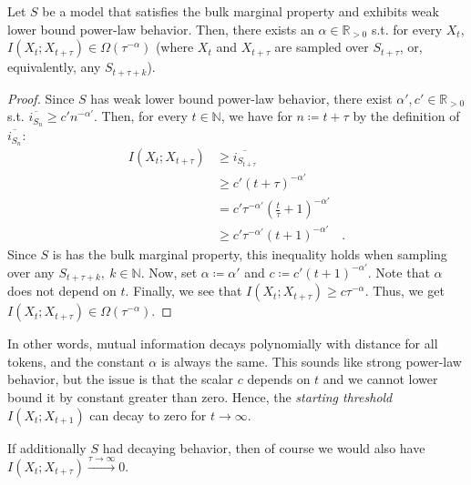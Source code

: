 \documentclass[../../main.tex]{subfiles}
\begin{document}
    \begin{theorem}
        \label{theorem:power_law_decay_in_well-behaved_models_with_weak_power-law_behavior}
        Let $S$ be a model that satisfies the bulk marginal property and exhibits weak lower bound power-law behavior. Then, there exists an $\alpha \in \mathbb{R}_{>0}$ s.t. for every $X_t$, $I(X_{t}; X_{t + \tau}) \in \Omega(\tau^{-\alpha})$ (where $X_t$ and $X_{t + \tau}$ are sampled over $S_{t + \tau}$, or, equivalently, any $S_{t + \tau + k}$).
    \end{theorem}
    \vspace{-2.5em}
    \begin{proof}
        Since $S$ has weak lower bound power-law behavior, there exist $\alpha', c' \in \mathbb{R}_{>0}$ s.t. $\overline{i_{S_n}} \geq c' n^{-\alpha'}$. Then, for every $t \in \mathbb{N}$, we have for $n \coloneqq t + \tau$ by the definition of $\overline{i_{S_n}}$:
        \begin{align*}
            I(X_{t}; X_{t + \tau}) &\geq \overline{i_{S_{t + \tau}}} \\
            &\geq c' (t + \tau)^{-\alpha'} \\
            &= c' \tau^{-\alpha'} (\frac{t}{\tau} + 1)^{-\alpha'} \\
            &\geq c' \tau^{-\alpha'} (t + 1)^{-\alpha'} \quad .
        \end{align*}
        Since $S$ is has the bulk marginal property, this inequality holds when sampling over any $S_{t + \tau + k}, \ k \in \mathbb{N}$. Now, set $\alpha \coloneqq \alpha'$ and $c \coloneqq c' (t + 1)^{-\alpha'}$. Note that $\alpha$ does not depend on $t$. Finally, we see that $I(X_{t}; X_{t + \tau}) \geq c \tau^{-\alpha}$. Thus, we get $I(X_{t}; X_{t + \tau}) \in \Omega(\tau^{-\alpha})$.
    \end{proof}

    In other words, mutual information decays polynomially with distance for all tokens, and the constant $\alpha$ is always the same. This sounds like strong power-law behavior, but the issue is that the scalar $c$ depends on $t$ and we cannot lower bound it by constant greater than zero. Hence, the \emph{starting threshold} $I(X_t; X_{t+1})$ can decay to zero for $t \to \infty$.

    \begin{remark}
        If additionally $S$ had decaying behavior, then of course we would also have $I(X_{t}; X_{t + \tau}) \xrightarrow{\tau \to \infty} 0$.
    \end{remark}
\end{document}
